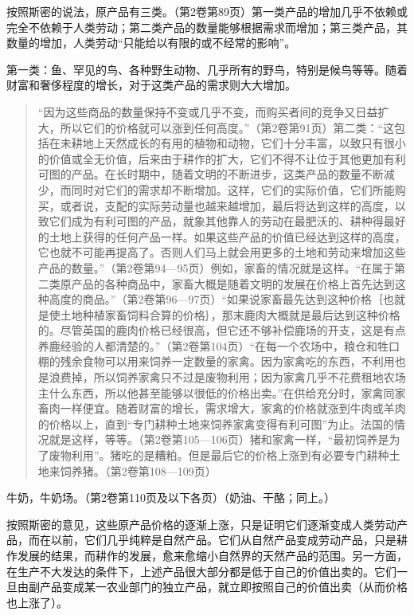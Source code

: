按照斯密的说法，原产品有三类。（第2卷第89页）第一类产品的增加几乎不依赖或完全不依赖于人类劳动；第二类产品的数量能够根据需求而增加；第三类产品，其数量的增加，人类劳动“只能给以有限的或不经常的影响”。

第一类：鱼、罕见的鸟、各种野生动物、几乎所有的野鸟，特别是候鸟等等。随着财富和奢侈程度的增长，对于这类产品的需求则大大增加。

\begin{quote}{“因为这些商品的数量保持不变或几乎不变，而购买者间的竞争又日益扩大，所以它们的价格就可以涨到任何高度。”（第2卷第91页）第二类：“这包括在未耕地上天然成长的有用的植物和动物，它们十分丰富，以致只有很小的价值或全无价值，后来由于耕作的扩大，它们不得不让位于其他更加有利可图的产品。在长时期中，随着文明的不断进步，这类产品的数量不断减少，而同时对它们的需求却不断增加。这样，它们的实际价值，它们所能购买，或者说，支配的实际劳动量也越来越增加，最后将达到这样的高度，以致它们成为有利可图的产品，就象其他靠人的劳动在最肥沃的、耕种得最好的土地上获得的任何产品一样。如果这些产品的价值已经达到这样的高度，它也就不可能再提高了。否则人们马上就会用更多的土地和劳动来增加这些产品的数量。”（第2卷第94—95页）例如，家畜的情况就是这样。“在属于第二类原产品的各种商品中，家畜大概是随着文明的发展在价格上首先达到这种高度的商品。”（第2卷第96—97页）“如果说家畜最先达到这种价格｛也就是使土地种植家畜饲料合算的价格｝，那末鹿肉大概就是最后达到这种价格的。尽管英国的鹿肉价格已经很高，但它还不够补偿鹿场的开支，这是有点养鹿经验的人都清楚的。”（第2卷第104页）“在每一个农场中，粮仓和牲口棚的残余食物可以用来饲养一定数量的家禽。因为家禽吃的东西，不利用也是浪费掉，所以饲养家禽只不过是废物利用；因为家禽几乎不花费租地农场主什么东西，所以他甚至能够以很低的价格出卖。”在供给充分时，家禽同家畜肉一样便宜。随着财富的增长，需求增大，家禽的价格就涨到牛肉或羊肉的价格以上，直到“专门耕种土地来饲养家禽变得有利可图”为止。法国的情况就是这样，等等。（第2卷第105—106页）猪和家禽一样，“最初饲养是为了废物利用”。猪吃的是糟粕。但是最后它的价格上涨到有必要专门耕种土地来饲养猪。（第2卷第108—109页）}\end{quote}

牛奶，牛奶场。（第2卷第110页及以下各页）（奶油、干酪；同上。）

按照斯密的意见，这些原产品价格的逐渐上涨，只是证明它们逐渐变成人类劳动产品，而在以前，它们几乎纯粹是自然产品。它们从自然产品变成劳动产品，只是耕作发展的结果，而耕作的发展，愈来愈缩小自然界的天然产品的范围。另一方面，在生产不大发达的条件下，上述产品很大部分都是低于自己的价值出卖的。它们一旦由副产品变成某一农业部门的独立产品，就立即按照自己的价值出卖（从而价格也上涨了）。

